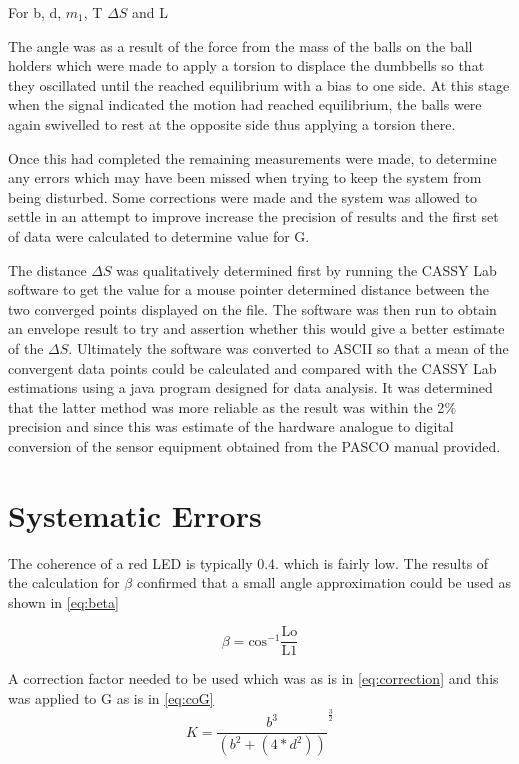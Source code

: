 \documentclass[12pt]{article}
\begin{document}
For b, d, $m_{1}$, T $\Delta{S}$ and L

The angle was as a result of the force from the mass of the balls on the ball holders which were made to apply a torsion to displace the dumbbells so that they oscillated until the reached equilibrium with a bias to one side. At this stage when the signal indicated the motion had reached equilibrium, the balls were again swivelled to rest at the opposite side thus applying a torsion there. 

Once this had completed the remaining measurements were made, to determine any errors which may have been missed when trying to keep the system from being disturbed. Some corrections were made and the system was allowed to settle in an attempt to improve increase the precision of results and the first set of data were calculated to determine value for G. 

The distance  $\Delta S$ was qualitatively determined first by running the CASSY Lab software to get the value for a mouse pointer determined distance between the two converged points displayed on the file. The software was then run to obtain an envelope result to try and assertion whether this would give a better estimate of the $\Delta S$. Ultimately the software was converted to ASCII so that a mean of the convergent data points could be calculated and compared with the CASSY Lab estimations using a java program designed for data analysis\cite{me}. It was determined that the latter method was more reliable as the result was within the 2$\%$ precision and since this was estimate of the hardware analogue to digital conversion of the sensor equipment  obtained from the PASCO manual provided.

\section*{Systematic Errors}

The coherence of a red LED is typically 0.4.\cite{red} which is fairly low. The results of the calculation for $\beta$ confirmed that a small angle approximation could be used as shown in \cref{eq:beta}

\begin{equation}
\label{eq:beta}
\beta=\mathrm{cos^{-1}\frac{Lo}{L1}}
\end{equation}

A correction factor needed to be used which was as is in \cref{eq:correction} and this was applied to G as is in \cref{eq:coG}
\begin{equation}
\label{eq:correction}
K= \frac{b^3}{(b^2 + (4*d^2))}^{\frac{3}{2}}
\end{equation}
\end{document}
